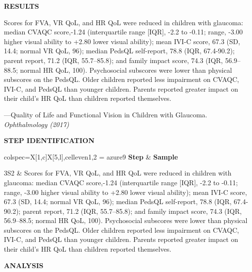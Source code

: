 \documentclass{ctexbook}
\begin{document}
\begin{sample}[label={myautocounter}]{\heiti}

  \textbf{RESULTS}
  
  Scores for FVA, VR QoL, and HR QoL were reduced in children with glaucoma: median CVAQC score,-1.24 (interquartile range [IQR], -2.2 to -0.11; range, -3.00 higher visual ability to +2.80 lower visual ability); mean IVI-C score, 67.3 (SD, 14.4; normal VR QoL, 96); median PedsQL self-report, 78.8 (IQR, 67.4-90.2); parent report, 71.2 (IQR, 55.7--85.8); and family impact score, 74.3 (IQR, 56.9--88.5; normal HR QoL, 100). Psychosocial subscores were lower than physical subscores on the PedsQL. Older children reported less impairment on CVAQC, IVI-C, and PedsQL than younger children. Parents reported greater impact on their child's HR QoL than children reported themselves.

  
  \begin{flushright}
    ---Quality of Life and Functional Vision in Children with Glaucoma. \emph{Ophthalmology (2017)}
  \end{flushright}

  \tcblower

  \noindent \textbf{STEP IDENTIFICATION}

  \vspace*{10pt}
  {\small\noindent
  \begin{tblr}{colspec={X[1,c]X[5,l]},cell{even}{1,2} = {azure9}}
    \toprule
    \textbf{Step} & \textbf{Sample} \\ 
    \midrule
  
    3S2 & Scores for FVA, VR QoL, and HR QoL were reduced in children with glaucoma: median CVAQC score,-1.24 (interquartile range [IQR], -2.2 to -0.11; range, -3.00 higher visual ability to +2.80 lower visual ability); mean IVI-C score, 67.3 (SD, 14.4; normal VR QoL, 96); median PedsQL self-report, 78.8 (IQR, 67.4-90.2); parent report, 71.2 (IQR, 55.7--85.8); and family impact score, 74.3 (IQR, 56.9--88.5; normal HR QoL, 100). Psychosocial subscores were lower than physical subscores on the PedsQL. Older children reported less impairment on CVAQC, IVI-C, and PedsQL than younger children. Parents reported greater impact on their child's HR QoL than children reported themselves.\\
    
    \bottomrule
  \end{tblr}
  }

  \noindent \textbf{ANALYSIS}


\end{sample}
\end{document}
